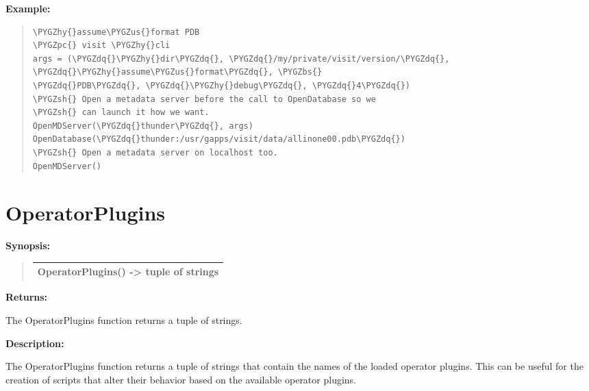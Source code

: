 \documentclass[letterpaper,10pt,english]{sphinxmanual}
\def\PYGZbs{\char`\\}
\def\PYGZus{\char`\_}
\def\PYGZsh{\char`\#}
\def\PYGZpc{\char`\%}
\def\PYGZhy{\char`\-}
\def\PYGZdq{\char`\"}
\begin{document}
\begin{DUlineblock}{0em}
\item[] \textbf{Example:}
\item[] 
\end{DUlineblock}
\begin{quote}

\begin{Verbatim}[commandchars=\\\{\}]
\PYGZhy{}assume\PYGZus{}format PDB
\PYGZpc{} visit \PYGZhy{}cli
args = (\PYGZdq{}\PYGZhy{}dir\PYGZdq{}, \PYGZdq{}/my/private/visit/version/\PYGZdq{}, \PYGZdq{}\PYGZhy{}assume\PYGZus{}format\PYGZdq{}, \PYGZbs{}
\PYGZdq{}PDB\PYGZdq{}, \PYGZdq{}\PYGZhy{}debug\PYGZdq{}, \PYGZdq{}4\PYGZdq{})
\PYGZsh{} Open a metadata server before the call to OpenDatabase so we
\PYGZsh{} can launch it how we want.
OpenMDServer(\PYGZdq{}thunder\PYGZdq{}, args)
OpenDatabase(\PYGZdq{}thunder:/usr/gapps/visit/data/allinone00.pdb\PYGZdq{})
\PYGZsh{} Open a metadata server on localhost too.
OpenMDServer()
\end{Verbatim}
\end{quote}


\section{OperatorPlugins}
\label{functions:operatorplugins}
\begin{DUlineblock}{0em}
\item[] \textbf{Synopsis:}
\end{DUlineblock}
\begin{quote}

\begin{tabulary}{\linewidth}{|L|}
\hline

OperatorPlugins() -\textgreater{} tuple of strings
\\
\hline\end{tabulary}

\end{quote}

\begin{DUlineblock}{0em}
\item[] 
\item[] \textbf{Returns:}
\item[] The OperatorPlugins function returns a tuple of strings.
\item[] 
\item[] \textbf{Description:}
\item[] The OperatorPlugins function returns a tuple of strings that contain the
names of the loaded operator plugins. This can be useful for the creation
of scripts that alter their behavior based on the available operator
plugins.
\end{DUlineblock}
\end{document}
